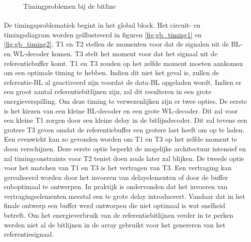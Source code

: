 \begin{figure}[!ht]
\centering
{}
\caption{Timingproblemen bij de bitline}
\end{figure}

\paragraph{}
De timingsproblematiek begint in het global block. Het circuit- en timingsdiagram worden geïllustreerd in figuren \ref{fig:gb_timing1} en \ref{fig:gb_timing2}. T1 en T2 stellen de momenten voor dat de signalen uit de BL- en WL-decoder komen. T3 stelt het moment voor dat het signaal uit de referentiebuffer komt. T1 en T3 zouden op het zelfde moment moeten aankomen om een optimale timing te hebben. Indien dit niet het geval is, zullen de referentie-BL al geactiveerd zijn voordat de data-BL opgeladen wordt. Indien er een groot aantal referentiebitlijnen zijn, zal dit resulteren in een grote energieverspilling. Om deze timing te verwezenlijken zijn er twee opties. De eerste is het kiezen van een kleine BL-decoder en een grote WL-decoder. Dit zal voor een kleine T1 zorgen door een kleine delay in de bitlijndecoder. Dit zal tevens een grotere T3 geven omdat de referentiebuffer een grotere last heeft om op te laden. Een evenwicht kan zo gevonden worden om T1 en T3 op het zelfde moment te doen verschijnen. Deze eerste optie beperkt de mogelijke architectuur intensief en zal timingconstraints voor T2 teniet doen zoals later zal blijken. De tweede optie voor het matchen van T1 en T3 is het vertragen van T3. Een vertraging kan gerealiseerd worden door het invoeren van delayelementen of door de buffer suboptimaal te ontwerpen. In praktijk is ondervonden dat het invoeren van vertragingselementen meestal een te grote delay introduceert. Vandaar dat in het finale ontwerp een buffer werd ontworpen die niet optimaal is wat snelheid betreft. Om het energieverbruik van de referentiebitlijnen verder in te perken werden niet al de bitlijnen in de array gebruikt voor het genereren van het referentiesignaal.

